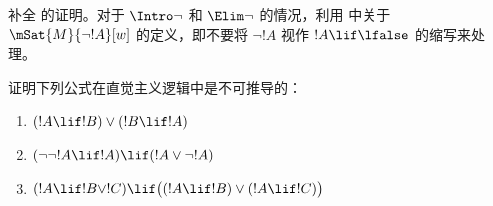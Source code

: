 \documentclass[../../../include/open-logic-section]{subfiles}
\begin{document}
\begin{prob}
  补全  的证明。对于 $\Intro\lnot$ 和 $\Elim\lnot$ 的情况，利用  中关于 $\mSat{M}{\lnot !A}[w]$ 的定义，即不要将 $\lnot !A$ 视作 $!A \lif \lfalse$ 的缩写来处理。
\end{prob}

\begin{prob}
  证明下列公式在直觉主义逻辑中是不可推导的：
  \begin{enumerate}
    \item $(!A \lif !B) \lor (!B \lif !A)$
    \item $(\lnot\lnot !A \lif !A) \lif (!A \lor \lnot !A)$
    \item $(!A \lif !B \lor !C) \lif \bigl((!A \lif !B)\lor(!A \lif !C)\bigr)$
  \end{enumerate}
\end{prob}
\end{document}
